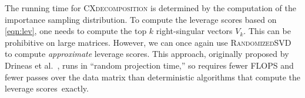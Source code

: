 The running time for \textsc{CXdecomposition} is determined by the
computation of the importance sampling distribution.  To compute the leverage
scores based on \eqref{eqn:lev}, one needs to compute the top
$k$ right-singular vectors $V_k$. This can be prohibitive on
large matrices.  However, we can once again
use \textsc{RandomizedSVD} to compute {\it approximate} leverage scores. This
approach, originally proposed by Drineas et al.~\cite{DMMW12_JMLR}, runs in
``random projection time,'' so requires fewer FLOPS and fewer passes over
the data matrix than deterministic algorithms that compute the
leverage scores~exactly.



